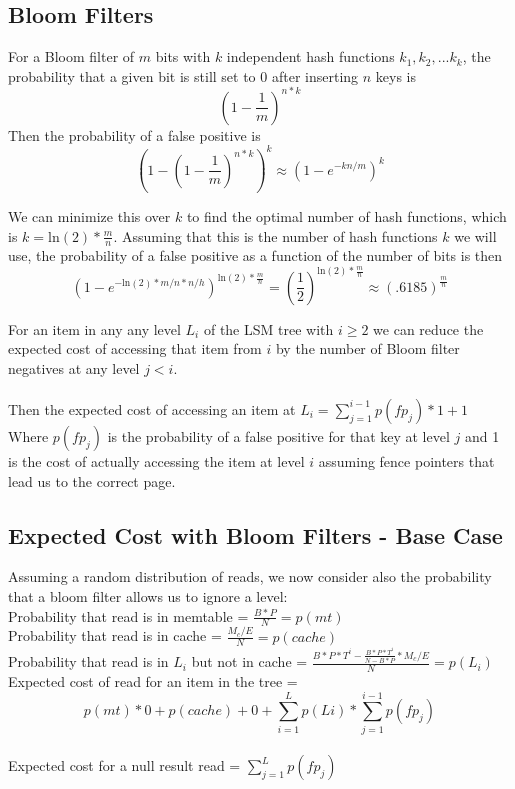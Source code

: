 \documentclass[11pt]{article}
\theoremstyle{plain}
\theoremstyle{definition}
\begin{document}
\subsection{Bloom Filters}

For a Bloom filter of $m$ bits with $k$ independent hash functions $k_1, k_2,...k_k$, the probability that a given bit is still set to 0 after inserting $n$ keys is 
$$
(1 - \frac{1}{m})^{n*k}
$$
Then the probability of a false positive is 
$$
(1- (1 - \frac{1}{m})^{n*k})^k \approx (1 - e^{-kn/m})^k
$$

We can minimize this over $k$ to find the optimal number of hash functions, which is $k = \mathrm{ln}(2) * \frac{m}{n}$. Assuming that this is the number of hash functions $k$ we will use, the probability of a false positive as a function of the number of bits is then 
$$
(1 - e^{-\mathrm{ln}(2)*m/n*n/h})^{\mathrm{ln}(2) * \frac{m}{n}} = (\frac{1}{2}) ^ {\mathrm{ln}(2) * \frac{m}{n}} \approx (.6185) ^  {\frac{m}{n}}
$$

For an item in any any level $L_i$ of the LSM tree with $i \geq 2$ we can reduce the expected cost of accessing that item from $i$ by the number of Bloom filter negatives at any level $j<i$. \\ \\
Then the expected cost of accessing an item at $L_i =  \sum_{j=1}^{i-1} p(fp_j) * 1 + 1$ \\
Where $p(fp_j)$ is the probability of a false positive for that key at level $j$ and 1 is the cost of actually accessing the item at level $i$ assuming fence pointers that lead us to the correct page.

\subsection{Expected Cost with Bloom Filters - Base Case}

Assuming a random distribution of reads, we now consider also the probability that a bloom filter allows us to ignore a level: \\
Probability that read is in memtable = $\frac{B*P}{N}  = p(mt)$\\
Probability that read is in cache = $\frac{M_c/E}{N} = p(cache)$ \\

Probability that read is in $L_i$ but not in cache = $ \frac{B*P*T^i - \frac{B*P*T^i}{N-B*P} * M_c/E}{N}  = p(L_i)$\\

Expected cost of read for an item in the tree = $$p(mt) * 0  + p(cache) + 0 + \sum_{i=1}^L p(Li) * \sum_{j=1}^{i-1} p(fp_j)$$ \\
Expected cost for a null result read = $\sum_{j=1}^{L} p(fp_j)$
\end{document}

